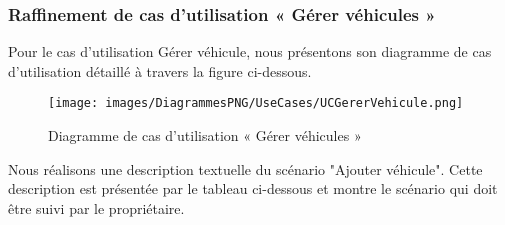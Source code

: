 {\subsubsection{Raffinement de cas d'utilisation « Gérer véhicules »}
Pour le cas d'utilisation Gérer véhicule, nous présentons son diagramme de cas d'utilisation détaillé à travers la figure ci-dessous.\\

\begin{figure}[H]
\centering
\texttt{[image: images/DiagrammesPNG/UseCases/UCGererVehicule.png]}
\caption{ Diagramme de cas d'utilisation « Gérer véhicules »}
\end{figure}

Nous réalisons une description textuelle du scénario "Ajouter véhicule". Cette description est présentée par le tableau ci-dessous et montre le scénario qui doit être suivi par le propriétaire.\\

}

